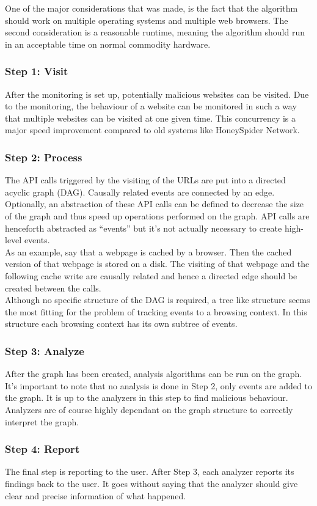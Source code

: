 One of the major considerations that was made, is the fact that the algorithm should work on multiple operating systems and multiple web browsers. The second consideration is a reasonable runtime, meaning the algorithm should run in an acceptable time on normal commodity hardware.

\subsubsection{Step 1: Visit}

After the monitoring is set up, potentially malicious websites can be visited. Due to the monitoring, the behaviour of a website can be monitored in such a way that multiple websites can be visited at one given time. This concurrency is a major speed improvement compared to old systems like HoneySpider Network.


\subsubsection{Step 2: Process}

The API calls triggered by the visiting of the URLs are put into a directed acyclic graph (DAG). Causally related events are connected by an edge. Optionally, an abstraction of these API calls can be defined to decrease the size of the graph and thus speed up operations performed on the graph. API calls are henceforth abstracted as ``events'' but it's not actually necessary to create high-level events.\\


As an example, say that a webpage is cached by a browser. Then the cached version of that webpage is stored on a disk. The visiting of that webpage and the following cache write are causally related and hence a directed edge should be created between the calls.\\

Although no specific structure of the DAG is required, a tree like structure seems the most fitting for the problem of tracking events to a browsing context. In this structure each browsing context has its own subtree of events. 



\subsubsection{Step 3: Analyze}

After the graph has been created, analysis algorithms can be run on the graph. It's important to note that no analysis is done in Step 2, only events are added to the graph. It is up to the analyzers in this step to find malicious behaviour. Analyzers are of course highly dependant on the graph structure to correctly interpret the graph.\\

\subsubsection{Step 4: Report}

The final step is reporting to the user. After Step 3, each analyzer reports its findings back to the user. It goes without saying that the analyzer should give clear and precise information of what happened.
